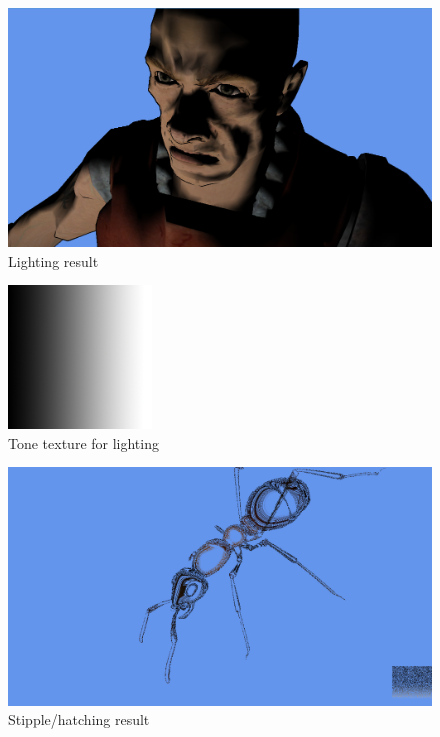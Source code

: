 \documentclass[annual]{acmsiggraph}
\begin{document}
\begin{figure}[h]
	\centering
	\includegraphics[width=5.5in]{images/lighting}
	\caption{Lighting result}
	\label{fig:lightingResult}
\end{figure}

\begin{figure}[h]
	\centering
	\includegraphics[width=1.5in]{images/xtoon_shading_gradient}
	\caption{Tone texture for lighting}
	\label{fig:gradient}
\end{figure}

\begin{figure}[h]
	\centering
	\includegraphics[width=5.5in]{images/stipple-hatch-result1}
	\caption{Stipple/hatching result}
	\label{fig:stippleHatch1}
\end{figure}
\end{document}
